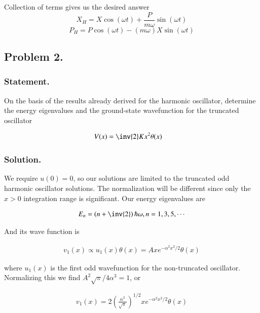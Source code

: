 Collection of terms gives us the desired answer
\begin{equation}\label{eqn:desaiCh9:110}
X_H = X \cos(\omega t) + \frac{P}{m \omega} \sin(\omega t)
\end{equation}
\begin{equation}\label{eqn:desaiCh9:111}
P_H = P \cos(\omega t) - (m \omega) X \sin(\omega t)
\end{equation}

\subsection{Problem 2.}
\subsubsection{Statement.}

On the basis of the results already derived for the harmonic oscillator, determine the energy eigenvalues and the ground-state wavefunction for the truncated oscillator

\begin{align*}
V(x) &= \inv{2} K x^2 \theta(x)
\end{align*}

\subsubsection{Solution.}

We require $u(0) = 0$, so our solutions are limited to the truncated odd harmonic oscillator solutions.  The normalization will be different since only the $x>0$ integration range is significant.  Our energy eigenvalues are

\begin{align}\label{eqn:desaiCh9:200}
E_n = \left( n + \inv{2} \right) \hbar \omega, n = 1, 3, 5, \cdots
\end{align}

And its wave function is 

\begin{align}\label{eqn:desaiCh9:201}
v_1(x) \propto u_1(x) \theta(x) = A x e^{-\alpha^2 x^2/2} \theta(x)
\end{align}

where $u_1(x)$ is the first odd wavefunction for the non-truncated oscillator.  Normalizing this we find $A^2 \sqrt{\pi}/4 \alpha^3 = 1$, or

\begin{align}\label{eqn:desaiCh9:202}
v_1(x) = 2 \left( \frac{\alpha^3}{\sqrt{\pi}}\right)^{1/2} x e^{-\alpha^2 x^2/2} \theta(x)
\end{align}

